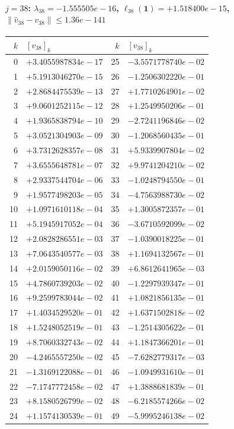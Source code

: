 \documentclass[11pt]{article}
\begin{document}
\paragraph{$j = 38$: $\lambda_{38} = -1.555505e-16$, \quad $\ell_{38}(\mathbf{1}) = +1.518400e-15$, \quad $\|\hat v_{38} - v_{38}\| \leq 1.36e-141$}
\begin{center}
{\footnotesize
\begin{tabular}{r@{\;\;}l@{\quad}r@{\;\;}l}
\toprule
$k$ & $[v_{38}]_k$ & $k$ & $[v_{38}]_k$ \\
\midrule
0 & $+3.4055987834e-17$ & 25 & $-3.5571778740e-02$ \\
1 & $+5.1913046270e-15$ & 26 & $-1.2506302220e-01$ \\
2 & $+2.8684475539e-13$ & 27 & $+1.7710264901e-02$ \\
3 & $+9.0601252115e-12$ & 28 & $+1.2549950206e-01$ \\
4 & $+1.9365838794e-10$ & 29 & $-2.7241196846e-02$ \\
5 & $+3.0521304903e-09$ & 30 & $-1.2068560435e-01$ \\
6 & $+3.7312628357e-08$ & 31 & $+5.9339907804e-02$ \\
7 & $+3.6555648781e-07$ & 32 & $+9.9741204210e-02$ \\
8 & $+2.9337544704e-06$ & 33 & $-1.0248794550e-01$ \\
9 & $+1.9577498203e-05$ & 34 & $-4.7563988730e-02$ \\
10 & $+1.0971610118e-04$ & 35 & $+1.3005872357e-01$ \\
11 & $+5.1945917052e-04$ & 36 & $-3.6710592099e-02$ \\
12 & $+2.0828286551e-03$ & 37 & $-1.0390018225e-01$ \\
13 & $+7.0643540577e-03$ & 38 & $+1.1694132567e-01$ \\
14 & $+2.0159050116e-02$ & 39 & $+6.8612641965e-03$ \\
15 & $+4.7860739203e-02$ & 40 & $-1.2297939347e-01$ \\
16 & $+9.2599783044e-02$ & 41 & $+1.0821856135e-01$ \\
17 & $+1.4034529520e-01$ & 42 & $+1.6371502818e-02$ \\
18 & $+1.5248052519e-01$ & 43 & $-1.2514305622e-01$ \\
19 & $+8.7060332743e-02$ & 44 & $+1.1847366201e-01$ \\
20 & $-4.2465557250e-02$ & 45 & $-7.6282779317e-03$ \\
21 & $-1.3169122088e-01$ & 46 & $-1.0949931610e-01$ \\
22 & $-7.1747772458e-02$ & 47 & $+1.3888681839e-01$ \\
23 & $+8.1580526799e-02$ & 48 & $-6.2185574266e-02$ \\
24 & $+1.1574130539e-01$ & 49 & $-5.9995246138e-02$ \\
\bottomrule
\end{tabular}
}
\end{center}
\end{document}
